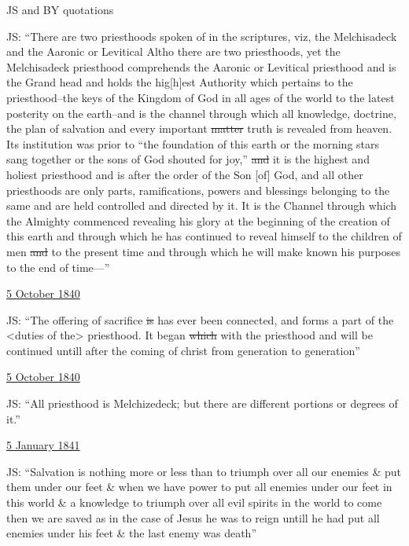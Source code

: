 \begin{compactitem}
			\item JS and BY quotations
				\begin{compactitem}
					\item JS: ``There are two priesthoods spoken of in the scriptures, viz, the Melchisadeck and the Aaronic or Levitical Altho there are two priesthoods, yet the Melchisadeck priesthood comprehends the Aaronic or Levitical priesthood and is the Grand head and holds the hig[h]est Authority which pertains to the priesthood--the keys of the Kingdom of God in all ages of the world to the latest posterity on the earth--and is the channel through which all knowledge, doctrine, the plan of salvation and every important \sout{matter} truth is revealed from heaven. Its institution was prior to ``the foundation of this earth or the morning stars sang together or the sons of God shouted for joy,'' \sout{and} it is the highest and holiest priesthood and is after the order of the Son [of] God, and all other priesthoods are only parts, ramifications, powers and blessings belonging to the same and are held controlled and directed by it. It is the Channel through which the Almighty commenced revealing his glory at the beginning of the creation of this earth and through which he has continued to reveal himself to the children of men \sout{and} to the present time and through which he will make known his purposes to the end of time---''
						\begin{compactitem}
							\item \hyperlink{EMS-1840-JS-CIR-5-OCT-1840-b}{5 October 1840}
						\end{compactitem}
					\item JS: ``The offering of sacrifice \sout{is} has ever been connected, and forms a part of the <duties of the> priesthood. It began \sout{which} with the priesthood and will be continued untill after the coming of christ from generation to generation''
						\begin{compactitem}
							\item \hyperlink{EMS-1840-JS-CIR-5-OCT-1840-w}{5 October 1840}
						\end{compactitem}
					\item JS: ``All priesthood is Melchizedeck; but there are different portions or degrees of it.''
						\begin{compactitem}
							\item \hyperlink{EMS-1841-JS-5-JAN-1841-WC-b}{5 January 1841}
						\end{compactitem}
					\item JS: ``Salvation is nothing more or less than to triumph over all our enemies \& put them under our feet \& when we have power to put all enemies under our feet in this world \& a knowledge to triumph over all evil spirits in the world to come then we are saved as in the case of Jesus he was to reign untill he had put all enemies under his feet \& the last enemy was death''

\end{compactitem}
\end{compactitem}
